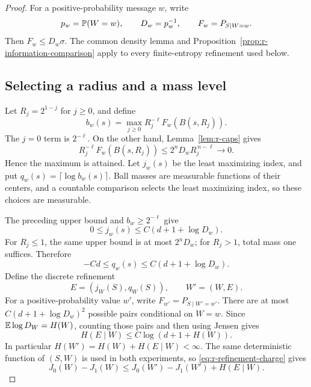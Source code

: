 \begin{proof}
For a positive-probability message \(w\), write
\[
 p_w=\mathbb P(W=w),\qquad D_w=p_w^{-1},\qquad
 F_w=P_{S\mid W=w}.
\]
Then \(F_w\le D_w\sigma\).  The common density lemma and
Proposition~\ref{prop:r-information-comparison} apply to every
finite-entropy refinement used below.

\subsection*{Selecting a radius and a mass level}

Let \(R_j=2^{1-j}\) for \(j\ge0\), and define
\begin{equation}\label{eq:r-critical-selector}
 b_w(s)=\max_{j\ge0} R_j^{-\ell}F_w(B(s,R_j)).
\end{equation}
The \(j=0\) term is \(2^{-\ell}\).  On the other hand,
Lemma~\ref{lem:r-caps} gives
\[
 R_j^{-\ell}F_w(B(s,R_j))
 \le 2^nD_wR_j^{\,n-\ell}\longrightarrow0.
\]
Hence the maximum is attained.  Let \(j_w(s)\) be the least
maximizing index, and put \(q_w(s)=\lceil\log b_w(s)\rceil\).
Ball masses are measurable functions of their centers, and a
countable comparison selects the least maximizing index, so these
choices are measurable.

The preceding upper bound and \(b_w\ge2^{-\ell}\) give
\[
 0\le j_w(s)\le C(d+1+\log D_w).
\]
For \(R_j\le1\), the same upper bound is at most \(2^nD_w\);
for \(R_j>1\), total mass one suffices.  Therefore
\[
 -Cd\le q_w(s)\le C(d+1+\log D_w).
\]
Define the discrete refinement
\[
 E=(j_W(S),q_W(S)),\qquad W'=(W,E).
\]
For a positive-probability value \(w'\), write
\(F_{w'}=P_{S\mid W'=w'}\).
There are at most \(C(d+1+\log D_w)^2\) possible pairs conditional
on \(W=w\).  Since \(\mathbb E\log D_W=H(W)\), counting those pairs
and then using Jensen gives
\begin{equation}\label{eq:r-critical-refinement-entropy}
 H(E\mid W)\le C\log(d+1+H(W)).
\end{equation}
In particular \(H(W')=H(W)+H(E\mid W)<\infty\).
The same deterministic function of \((S,W)\) is used in both
experiments, so \eqref{eq:r-refinement-charge} gives
\begin{equation}\label{eq:r-critical-refinement-charge}
 J_0(W)-J_1(W)
 \le J_0(W')-J_1(W')+H(E\mid W).
\end{equation}


\end{proof}
